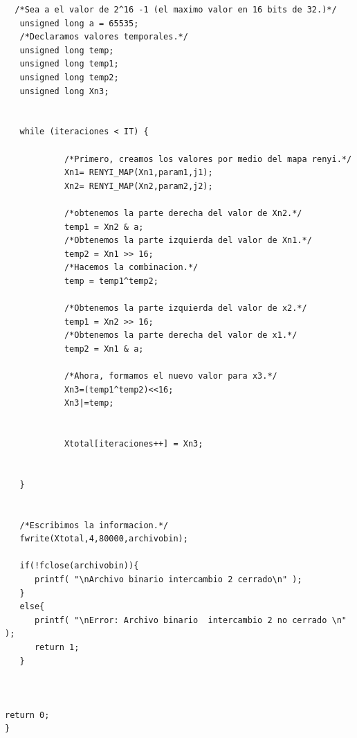 \documentclass[10pt]{IEEEtran}
\begin{document}
\begin{verbatim}
  /*Sea a el valor de 2^16 -1 (el maximo valor en 16 bits de 32.)*/
   unsigned long a = 65535;
   /*Declaramos valores temporales.*/
   unsigned long temp;
   unsigned long temp1;
   unsigned long temp2;
   unsigned long Xn3;


   while (iteraciones < IT) {

            /*Primero, creamos los valores por medio del mapa renyi.*/
            Xn1= RENYI_MAP(Xn1,param1,j1);
            Xn2= RENYI_MAP(Xn2,param2,j2);

            /*obtenemos la parte derecha del valor de Xn2.*/
            temp1 = Xn2 & a;
            /*Obtenemos la parte izquierda del valor de Xn1.*/
            temp2 = Xn1 >> 16;
            /*Hacemos la combinacion.*/
            temp = temp1^temp2;

            /*Obtenemos la parte izquierda del valor de x2.*/
            temp1 = Xn2 >> 16;
            /*Obtenemos la parte derecha del valor de x1.*/
            temp2 = Xn1 & a;
            
            /*Ahora, formamos el nuevo valor para x3.*/
            Xn3=(temp1^temp2)<<16;
            Xn3|=temp;


            Xtotal[iteraciones++] = Xn3;
             
         
   } 
 

   /*Escribimos la informacion.*/
   fwrite(Xtotal,4,80000,archivobin); 

   if(!fclose(archivobin)){
      printf( "\nArchivo binario intercambio 2 cerrado\n" );
   }
   else{
      printf( "\nError: Archivo binario  intercambio 2 no cerrado \n" );
      return 1;
   }  

  

return 0;
}
\end{verbatim}
\end{document}
